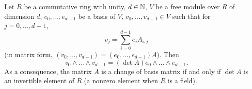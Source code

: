 \begin{proposition}
  Let
    $R$ be a commutative ring with unity,
    $d \in \mathbb{N}$,
    $V$ be a free module over $R$ of dimension $d$,
    $e_0, ..., e_{d - 1}$ be a basis of $V$,
    $v_0, ..., v_{d - 1} \in V$ such that for $j = 0, ..., d - 1$,
  \begin{equation}
    v_j = \sum_{i = 0}^{d - 1} e_i A_{i, j}
  \end{equation}
  (in matrix form, $(v_0, ..., v_{d - 1}) = (e_0, ..., e_{d - 1}) A$).
  Then
  \begin{equation}
    v_0 \wedge ... \wedge v_{d - 1} = (\det A) e_0 \wedge ... \wedge e_{d - 1}.
  \end{equation}
  As a consequence, the matrix $A$ is a change of basis matrix if and only if
  $\det A$ is an invertible element of $R$
  (a nonzero element when $R$ is a field).
\end{proposition}
